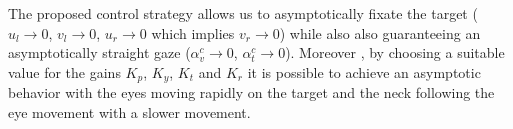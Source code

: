 The proposed control strategy allows us to asymptotically fixate the target 
($u_l \rightarrow 0$, $v_l \rightarrow 0$, $u_r \rightarrow 0$ which 
implies $v_r \rightarrow 0$) while also also guaranteeing an asymptotically 
straight gaze ($\alpha_v^c \rightarrow 0$, $\alpha_t^c \rightarrow 0$). Moreover
, by choosing a suitable value for the gains $K_p$, $K_y$, $K_t$ and $K_r$ it
is possible to achieve an asymptotic behavior with the eyes moving rapidly on 
the target and the neck following the eye movement with a slower 
movement.
